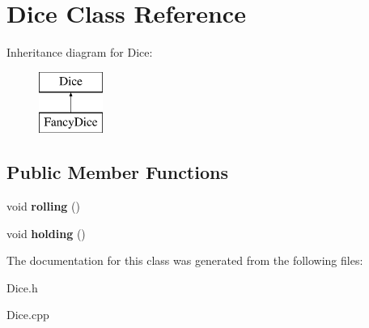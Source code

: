 \hypertarget{class_dice}{\section{Dice Class Reference}
\label{class_dice}
}
Inheritance diagram for Dice\+:\begin{figure}[H]
\begin{center}
\leavevmode
\includegraphics[height=2.000000cm]{class_dice}
\end{center}
\end{figure}
\subsection*{Public Member Functions}
\begin{DoxyCompactItemize}
\item 
\hypertarget{class_dice_a387ae2eb9925a0446dbe71ea2277e7c4}{void {\bfseries rolling} ()}\label{class_dice_a387ae2eb9925a0446dbe71ea2277e7c4}

\item 
\hypertarget{class_dice_a59e82d0bfe38167f094fc3db73cb409f}{void {\bfseries holding} ()}\label{class_dice_a59e82d0bfe38167f094fc3db73cb409f}

\end{DoxyCompactItemize}


The documentation for this class was generated from the following files\+:\begin{DoxyCompactItemize}
\item 
Dice.\+h\item 
Dice.\+cpp\end{DoxyCompactItemize}
